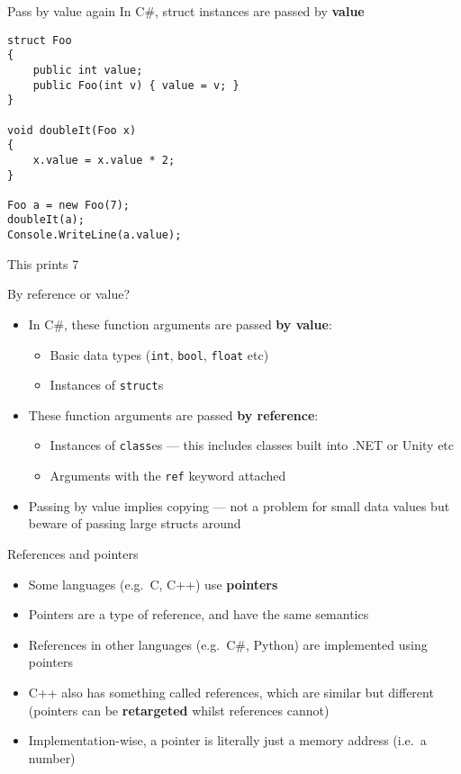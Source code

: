 \begin{frame}[fragile]{Pass by value again}
	In C\#, struct instances are passed by \textbf{value}
	\pause
	\begin{lstlisting}
struct Foo
{
	public int value;
	public Foo(int v) { value = v; }
}

void doubleIt(Foo x)
{
    x.value = x.value * 2;
}

Foo a = new Foo(7);
doubleIt(a);
Console.WriteLine(a.value);
	\end{lstlisting}
	\pause
	This prints 7
\end{frame}

\begin{frame}{By reference or value?}
    \begin{itemize}
		\pause\item In C\#, these function arguments are passed \textbf{by value}:
			\begin{itemize}
				\pause\item Basic data types (\lstinline{int}, \lstinline{bool}, \lstinline{float} etc)
				\pause\item Instances of \lstinline{struct}s
			\end{itemize}
		\pause\item These function arguments are passed \textbf{by reference}:
			\begin{itemize}
				\pause\item Instances of \lstinline{class}es --- this includes classes built into .NET or Unity etc
				\pause\item Arguments with the \lstinline{ref} keyword attached
			\end{itemize}
		\pause\item Passing by value implies copying --- not a problem for small data values but beware of passing large structs around
    \end{itemize}
\end{frame}

\begin{frame}{References and pointers}
    \begin{itemize}
        \pause\item Some languages (e.g.\ C, C++) use \textbf{pointers}
        \pause\item Pointers are a type of reference, and have the same semantics
        \pause\item References in other languages (e.g.\ C\#, Python) are implemented using pointers
        \pause\item C++ also has something called references, which are similar but different
            (pointers can be \textbf{retargeted} whilst references cannot)
		\pause\item Implementation-wise, a pointer is literally just a memory address (i.e.\ a number)
    \end{itemize}
\end{frame}

